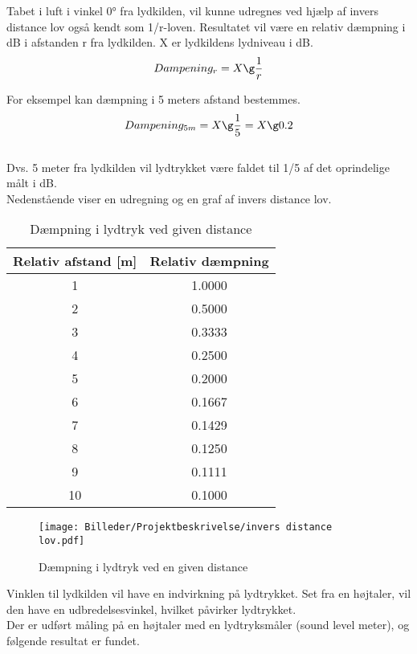 Tabet i luft i vinkel 0° fra lydkilden, vil kunne udregnes ved hjælp af invers distance lov også kendt som 1/r-loven. Resultatet vil være en relativ dæmpning i dB i afstanden r fra lydkilden. X er lydkildens lydniveau i dB.
\begin{equation}
Dampening_r = X\g \frac{1}{r}
\end{equation}

For eksempel kan dæmpning i 5 meters afstand bestemmes.
\begin{equation}
Dampening_{5m} = X\g \frac{1}{5}=X\g 0.2
\end{equation}
\pagebreak\\

Dvs. 5 meter fra lydkilden vil lydtrykket være faldet til 1/5 af det oprindelige målt i dB.\\
Nedenstående viser en udregning og en graf af invers distance lov.\\

\begin{table}[H]
	\centering
		\begin{tabular}{|c|c|}
			\hline
			Relativ afstand [m] & Relativ dæmpning \\ \hline
			1 & 1.0000\\ \hline
			2 & 0.5000\\ \hline
			3 & 0.3333\\ \hline
			4 & 0.2500\\ \hline
			5 & 0.2000\\ \hline
			6 & 0.1667\\ \hline
			7 & 0.1429\\ \hline
			8 & 0.1250\\ \hline
			9 & 0.1111\\ \hline
			10 & 0.1000\\ \hline
		\end{tabular}
	\caption{Dæmpning i lydtryk ved given distance}
	\label{tab:lydtryk vs distance}
\end{table}

\begin{figure}[h!]
  \centering
    \texttt{[image: Billeder/Projektbeskrivelse/invers distance lov.pdf]}
    \caption{Dæmpning i lydtryk ved en given distance}
\end{figure}\medskip

Vinklen til lydkilden vil have en indvirkning på lydtrykket. Set fra en højtaler, vil den have en udbredelsesvinkel, hvilket påvirker lydtrykket.\\
Der er udført måling på en højtaler med en lydtryksmåler (sound level meter), og følgende resultat er fundet.

